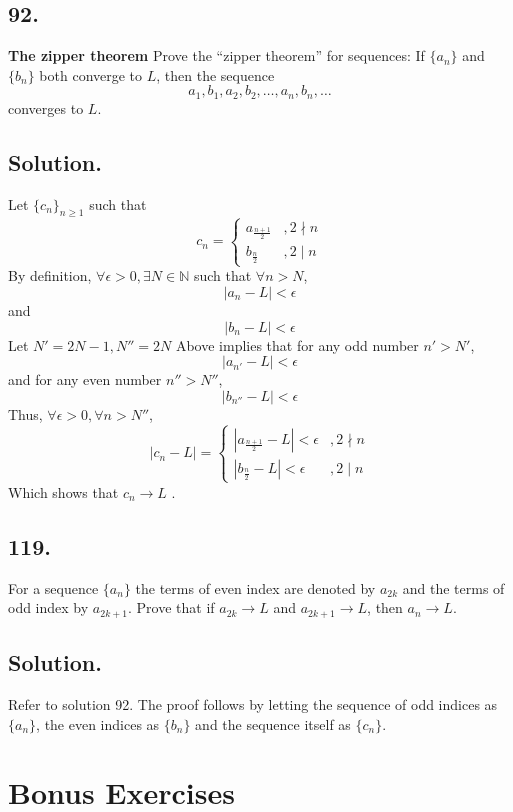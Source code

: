 \documentclass{article}
\begin{document}
\subsection*{92.}
\textbf{The zipper theorem} Prove the “zipper theorem” for sequences: If $\{a_n\}$ and $\{b_n\}$ both converge to $L$, then the sequence 
\[a_1,b_1,a_2,b_2,\dots,a_n,b_n,\dots\]
converges to $L$.
\subsection*{Solution.}
Let $\{c_n\}_{n\geq1}$ such that
\[ c_n=\begin{cases} 
       a_{\frac{n+1}{2}}& , 2\nmid n \\
       b_{\frac{n}{2}} & , 2 \mid n
   \end{cases}
\]
By definition, $\forall \epsilon>0, \exists N\in\mathbb{N}$ such that $\forall n>N$,
\[|a_n-L|<\epsilon \]
and
\[|b_n-L|<\epsilon\]
Let $N'=2N-1,N''=2N$\newline
Above implies that for any odd number $n'>N'$,
\[|a_{n'}-L|<\epsilon \]
and for any even number $n''>N''$,
\[|b_{n''}-L|<\epsilon\]
Thus, $\forall \epsilon>0, \forall n>N''$,
\[ |c_n-L|=\begin{cases} 
       |a_{\frac{n+1}{2}}-L|<\epsilon & , 2\nmid n \\
       |b_{\frac{n}{2}}-L| <\epsilon & , 2\mid n
   \end{cases}
\]
Which shows that $c_n\rightarrow L$ .
\subsection*{119.}
For a sequence $\{a_n\}$ the terms of even index are denoted by $a_{2k}$
and the terms of odd index by $a_{2k+1}$. Prove that if $a_{2k} \rightarrow L$ and $a_{2k+1} \rightarrow L$, then $a_n \rightarrow L$.
\subsection*{Solution.}
Refer to solution 92. The proof follows by letting the sequence of odd indices as $\{a_n\}$, the even indices as $\{b_n\}$ and the sequence itself as $\{c_n\}$.
\section*{Bonus Exercises}
\end{document}
